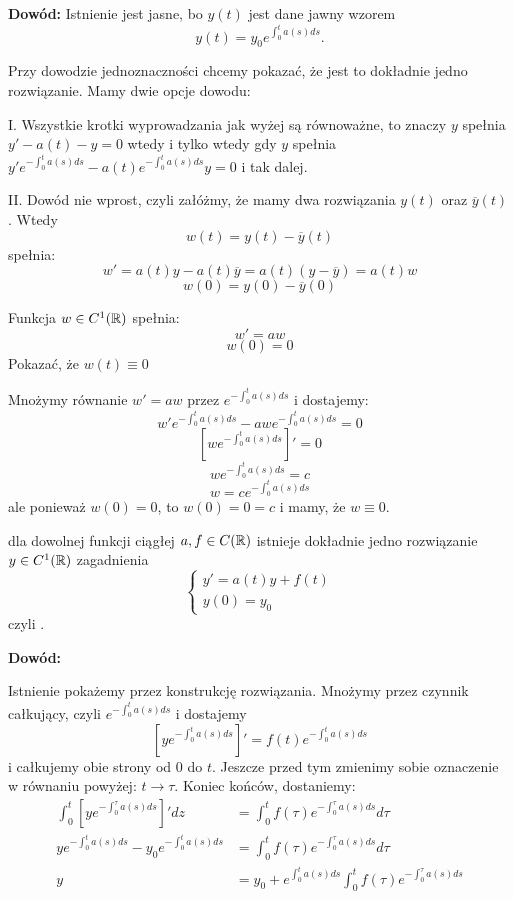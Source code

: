 \textbf{Dowód:} Istnienie jest jasne, bo $y(t)$ jest dane jawny wzorem
$$y(t)=y_0e^{\int_0^ta(s)ds}.$$

Przy dowodzie jednoznaczności chcemy pokazać, że jest to dokładnie jedno rozwiązanie. Mamy dwie opcje dowodu:

\indent I. Wszystkie krotki wyprowadzania jak wyżej są równoważne, to znaczy $y$ spełnia $y'-a(t)-y=0$ wtedy i tylko wtedy gdy $y$ spełnia $y'e^{-\int_0^ta(s)ds}-a(t)e^{-\int_0^ta(s)ds}y=0$ i tak dalej.

\indent II. Dowód nie wprost, czyli załóżmy, że mamy dwa rozwiązania $y(t)$ oraz $\overline y(t)$. Wtedy
$$w(t)=y(t)-\overline y(t)$$
spełnia:
$$w'=a(t)y-a(t)\overline y=a(t)(y-\overline y)=a(t)w$$
$$w(0)=y(0)-\overline y(0)$$

Funkcja $w\in C^1(\mathbb{R})$ spełnia:
$$w'=aw$$
$$w(0)=0$$
Pokazać, że $w(t)\equiv 0$

Mnożymy równanie $w'=aw$ przez $e^{-\int_0^ta(s)ds}$ i dostajemy:
$$w'e^{-\int_0^ta(s)ds}-awe^{-\int_0^ta(s)ds}=0$$
$$\left[we^{-\int_0^ta(s)ds}\right]'=0$$
$$we^{-\int_0^ta(s)ds}=c$$
$$w=ce^{-\int_0^ta(s)ds}$$
ale ponieważ $w(0)=0$, to $w(0)=0=c$ i mamy, że $w\equiv 0$.
\medskip

\medskip

 dla dowolnej funkcji ciągłej $a,f\in C(\mathbb{R})$ istnieje dokładnie jedno rozwiązanie $y\in C^1(\mathbb{R})$ zagadnienia
$$\begin{cases}
    y'=a(t)y+f(t)\\
    y(0)=y_0
\end{cases}$$
czyli .

\textbf{Dowód:}

Istnienie pokażemy przez konstrukcję rozwiązania. Mnożymy przez czynnik całkujący, czyli $e^{-\int_0^ta(s)ds}$ i dostajemy
$$\left[ye^{-\int_0^ta(s)ds}\right]'=f(t)e^{-\int_0^ta(s)ds}$$
i całkujemy obie strony od $0$ do $t$. Jeszcze przed tym zmienimy sobie oznaczenie w równaniu powyżej: $t\to \tau$. Koniec końców, dostaniemy:
\begin{align*}
    \int_0^t\left[ye^{-\int_0^\tau a(s)ds}\right]'dz&=\int_0^tf(\tau)e^{-\int_0^\tau a(s)ds}d\tau\\
    ye^{-\int_0^ta(s)ds}-y_0e^{-\int_0^ta(s)ds}&=\int_0^tf(\tau)e^{-\int_0^\tau a(s)ds}d\tau\\
    y&=y_0+  e^{\int_0^ta(s)ds}\int_0^tf(\tau)e^{-\int_0^\tau a(s)ds}
\end{align*}

